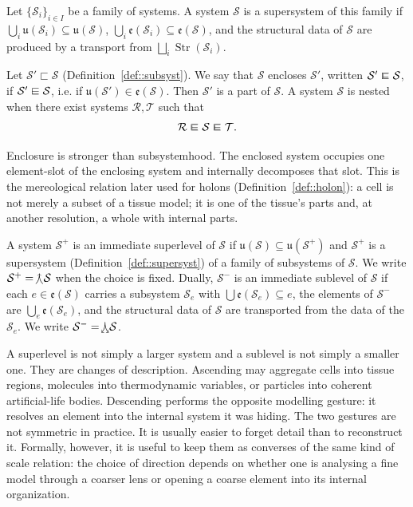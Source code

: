\documentclass[runningheads]{llncs}
\makeatletter
\newcommand\Slv[2][]{\hspace{-0.9pt}{\curlywedgeuparrow^{#1}}{#2}}
\newcommand\slv[2][]{\hspace{-0.88pt}{\curlywedgedownarrow^{#1}}{#2}}
\newcommand\sqin{\mathrel{\raisebox{0.1ex}{\ooalign{$\sqsubset$\cr $-$}}}}
\newcommand{\superimpose}[2]{{\ooalign{$#1\@firstoftwo#2$\cr\hfil$#1\@secondoftwo#2$\hfil\cr}}}
\newcommand{\encloses}{\mathrel{\mathpalette\superimpose{{\sqsubset}{\hfil{\raisebox{0.09ex}{\scalebox{0.85}[0.7]{$\sqin$}}}}}}}
\newcommand{\encl}{\mathrel{\raisebox{0.1ex}{$\encloses$}}}
\newcommand{\Str}{\operatorname{Str}}
\makeatother
\begin{document}
\begin{definition}[Supersystem]\label{def::supersyst}
Let $\{\mathcal S_i\}_{i\in I}$ be a family of systems. A system $\mathcal S$ is a supersystem of this family if $\bigcup_i\mathfrak u(\mathcal S_i)\subseteq\mathfrak u(\mathcal S)$, $\bigcup_i\mathfrak e(\mathcal S_i)\subseteq\mathfrak e(\mathcal S)$, and the structural data of $\mathcal S$ are produced by a transport from $\bigsqcup_i\Str(\mathcal S_i)$.
\end{definition}

\begin{definition}\label{def::encl}
Let $\mathcal S'\sqsubset\mathcal S$ (Definition~\ref{def::subsyst}). We say that $\mathcal S$ encloses $\mathcal S'$, written $\mathcal S'\encl\mathcal S$, if $\mathcal S'\sqin\mathcal S$, i.e. if $\mathfrak u(\mathcal S')\in\mathfrak e(\mathcal S)$. Then $\mathcal S'$ is a part of $\mathcal S$. A system $\mathcal S$ is nested when there exist systems $\mathcal R,
\mathcal T$ such that
\[
\mathcal R\encl\mathcal S\encl\mathcal T.
\]
\end{definition}

Enclosure is stronger than subsystemhood. The enclosed system occupies one element-slot of the enclosing system and internally decomposes that slot. This is the mereological relation later used for holons (Definition~\ref{def::holon}): a cell is not merely a subset of a tissue model; it is one of the tissue's parts and, at another resolution, a whole with internal parts.

\begin{definition}[Levels]\label{def::levels}
A system $\mathcal S^+$ is an immediate superlevel of $\mathcal S$ if $\mathfrak u(\mathcal S)\subseteq\mathfrak u(\mathcal S^+)$ and $\mathcal S^+$ is a supersystem (Definition~\ref{def::supersyst}) of a family of subsystems of $\mathcal S$. We write $\mathcal S^+=\Slv{}\mathcal S$ when the choice is fixed. Dually, $\mathcal S^-$ is an immediate sublevel of $\mathcal S$ if each $e\in\mathfrak e(\mathcal S)$ carries a subsystem $\mathcal S_e$ with $\bigcup\mathfrak e(\mathcal S_e)\subseteq e$, the elements of $\mathcal S^-$ are $\bigcup_e\mathfrak e(\mathcal S_e)$, and the structural data of $\mathcal S$ are transported from the data of the $\mathcal S_e$. We write $\mathcal S^-=\slv{}\mathcal S$.
\end{definition}

A superlevel is not simply a larger system and a sublevel is not simply a smaller one. They are changes of description. Ascending may aggregate cells into tissue regions, molecules into thermodynamic variables, or particles into coherent artificial-life bodies. Descending performs the opposite modelling gesture: it resolves an element into the internal system it was hiding. The two gestures are not symmetric in practice. It is usually easier to forget detail than to reconstruct it. Formally, however, it is useful to keep them as converses of the same kind of scale relation: the choice of direction depends on whether one is analysing a fine model through a coarser lens or opening a coarse element into its internal organization.
\end{document}
